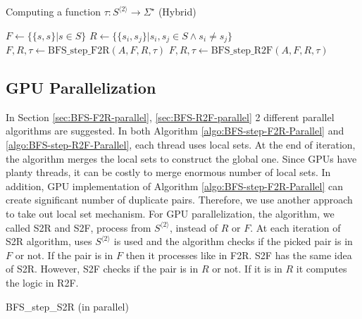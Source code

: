 \documentclass[12pt]{article}
\begin{document}
\begin{algorithm}[ht]
	\label{algo:BFS-Hybrid}
	\caption{Computing a function $\tau : S^{\langle 2 \rangle} \rightarrow \Sigma^\star$ (Hybrid)}
	
	

	
	$F \longleftarrow \{ \{ s,s \} | s \in S \}$\;
	$R \longleftarrow \{ \{ s_i,s_j \} | s_i,s_j \in S \wedge s_i \neq s_j \}$\;
	{
		{
			$F,R,\tau \longleftarrow \mbox{BFS\_step\_F2R}(A,F,R,\tau)$\;
		}
		\Else
		{
			$F,R,\tau \longleftarrow \mbox{BFS\_step\_R2F}(A,F,R,\tau)$\;
		}
	}
\end{algorithm}

\subsection{GPU Parallelization}
\label{sec:BFS-GPU}
In Section \ref{sec:BFS-F2R-parallel}, \ref{sec:BFS-R2F-parallel} 2 different parallel algorithms are suggested. In both Algorithm \ref{algo:BFS-step-F2R-Parallel} and \ref{algo:BFS-step-R2F-Parallel}, each thread uses local sets. At the end of iteration, the algorithm merges the local sets to construct the global one. Since GPUs have planty threads, it can be costly to merge enormous number of local sets. In addition, GPU implementation of Algorithm \ref{algo:BFS-step-F2R-Parallel} can create significant number of duplicate pairs. Therefore, we use another approach to take out local set mechanism. For GPU parallelization, the algorithm, we called S2R and S2F, process from $S^{\langle 2 \rangle}$, instead of $R$ or $F$. At each iteration of S2R algorithm,  uses $S^{\langle 2 \rangle}$ is used and the algorithm checks if the picked pair is in $F$ or not. If the pair is in $F$ then it processes like in F2R. S2F has the same idea of S2R. However, S2F checks if the pair is in $R$ or not. If it is in $R$ it computes the logic in R2F. 

\begin{algorithm}[ht]
	\label{algo:BFS-step-S2R-Parallel}
	\caption{BFS\_step\_S2R (in parallel)}
	
	
	{
	}
	
\end{algorithm}
\end{document}
